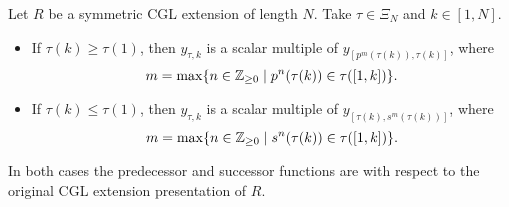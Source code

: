 \begin{lemma}\label{lem:y_tauk_y_brackets}
	Let $R$ be a symmetric CGL extension of length $N$. Take $\tau \in \Xi_N$ and $k \in [1, N]$.
	\begin{itemize}
		\item If $\tau(k) \geq \tau(1)$, then $y_{\tau,k}$ is a scalar multiple of $y_{[p^m(\tau(k)),
							      \tau(k)]}$, where
		      \begin{equation*}
			      m = \max\{n \in \mathbb{Z}_{\geq 0} \mid p^n(\tau(k)) \in \tau([1,k])\}.
		      \end{equation*}
		\item If $\tau(k) \leq \tau(1)$, then $y_{\tau,k}$ is a scalar multiple of $y_{[\tau(k),s^m(
							      \tau(k))]}$, where
		      \begin{equation*}
			      m = \max\{n \in \mathbb{Z}_{\geq 0} \mid s^n(\tau(k)) \in \tau([1,k])\}.
		      \end{equation*}
	\end{itemize}
	In both cases the predecessor and successor functions are with respect to the original
	CGL extension presentation of $R$.
\end{lemma}
